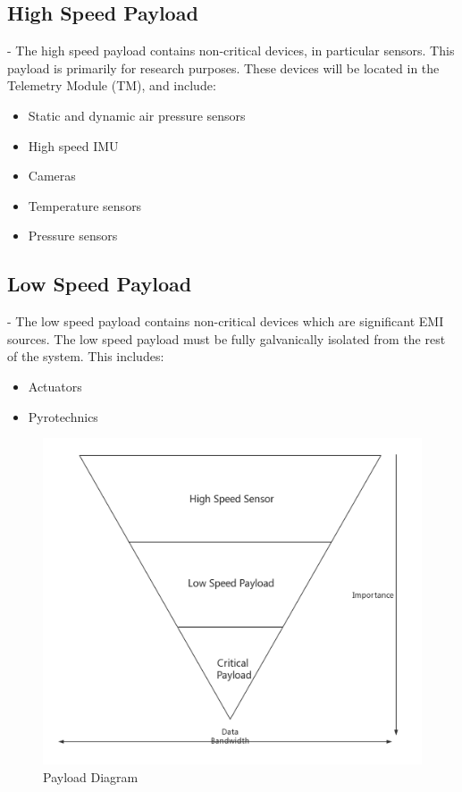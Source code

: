 \documentclass[12pt,article]{memoir}
\begin{document}
\subsection{High Speed Payload} - The high speed payload contains non-critical devices, in particular sensors. This payload is primarily for research purposes. These devices will be located in the Telemetry Module (TM), and include:
\begin{itemize}
\item Static and dynamic air pressure sensors
\item High speed IMU
\item Cameras
\item Temperature sensors
\item Pressure sensors
\end{itemize}

\subsection{Low Speed Payload} - The low speed payload contains non-critical devices which are significant EMI sources. The low speed payload must be fully galvanically isolated from the rest of the system. This includes:
\begin{itemize}
\item Actuators
\item Pyrotechnics
\end{itemize}
\begin{figure}[htp]
\includegraphics[width=\textwidth]{ES00002_payloadCata.png}
 \caption{Payload Diagram}	
\end{figure}
\end{document}
